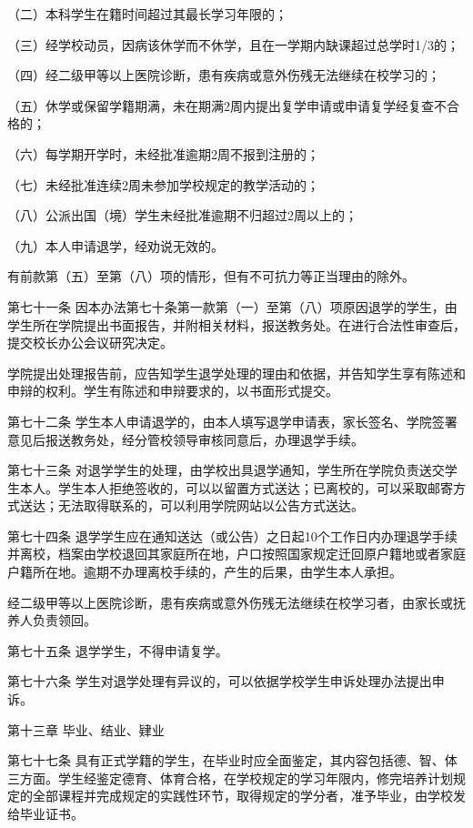 \documentclass[UTF8,12pt,a4paper]{report}
\begin{document}
（二）本科学生在籍时间超过其最长学习年限的；

（三）经学校动员，因病该休学而不休学，且在一学期内缺课超过总学时1/3的；

（四）经二级甲等以上医院诊断，患有疾病或意外伤残无法继续在校学习的；

（五）休学或保留学籍期满，未在期满2周内提出复学申请或申请复学经复查不合格的；

（六）每学期开学时，未经批准逾期2周不报到注册的；

（七）未经批准连续2周未参加学校规定的教学活动的；

（八）公派出国（境）学生未经批准逾期不归超过2周以上的；

（九）本人申请退学，经劝说无效的。

有前款第（五）至第（八）项的情形，但有不可抗力等正当理由的除外。

第七十一条  因本办法第七十条第一款第（一）至第（八）项原因退学的学生，由学生所在学院提出书面报告，并附相关材料，报送教务处。在进行合法性审查后，提交校长办公会议研究决定。

学院提出处理报告前，应告知学生退学处理的理由和依据，并告知学生享有陈述和申辩的权利。学生有陈述和申辩要求的，以书面形式提交。

第七十二条  学生本人申请退学的，由本人填写退学申请表，家长签名、学院签署意见后报送教务处，经分管校领导审核同意后，办理退学手续。

第七十三条  对退学学生的处理，由学校出具退学通知，学生所在学院负责送交学生本人。学生本人拒绝签收的，可以以留置方式送达；已离校的，可以采取邮寄方式送达；无法取得联系的，可以利用学院网站以公告方式送达。

第七十四条  退学学生应在通知送达（或公告）之日起10个工作日内办理退学手续并离校，档案由学校退回其家庭所在地，户口按照国家规定迁回原户籍地或者家庭户籍所在地。逾期不办理离校手续的，产生的后果，由学生本人承担。

经二级甲等以上医院诊断，患有疾病或意外伤残无法继续在校学习者，由家长或抚养人负责领回。

第七十五条  退学学生，不得申请复学。

第七十六条  学生对退学处理有异议的，可以依据学校学生申诉处理办法提出申诉。



第十三章  毕业、结业、肄业

第七十七条  具有正式学籍的学生，在毕业时应全面鉴定，其内容包括德、智、体三方面。学生经鉴定德育、体育合格，在学校规定的学习年限内，修完培养计划规定的全部课程并完成规定的实践性环节，取得规定的学分者，准予毕业，由学校发给毕业证书。
\end{document}
